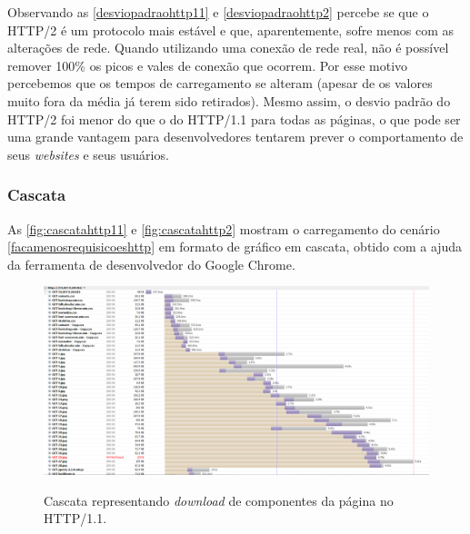 
\clearpage


Observando as \autoref{desviopadraohttp11} e \autoref{desviopadraohttp2} percebe se que o HTTP/2 é um protocolo mais estável e que, aparentemente, sofre menos com as alterações de rede. Quando utilizando uma conexão de rede real, não é possível remover 100\% os picos e vales de conexão que ocorrem. Por esse motivo percebemos que os tempos de carregamento se alteram (apesar de os valores muito fora da média já terem sido retirados). Mesmo assim, o desvio padrão do HTTP/2 foi menor do que o do HTTP/1.1 para todas as páginas, o que pode ser uma grande vantagem para desenvolvedores tentarem prever o comportamento de seus \textit{websites} e seus usuários.

\subsubsection{Cascata}
\label{cascata}

As \autoref{fig:cascatahttp11} e \autoref{fig:cascatahttp2} mostram o carregamento do cenário \autoref{facamenosrequisicoeshttp} em formato de gráfico em cascata, obtido com a ajuda da ferramenta de desenvolvedor do Google Chrome.

\begin{figure}[!htbp]
    \centering
    \caption{Cascata representando \textit{download} de componentes da página no HTTP/1.1.}
    \includegraphics[width=1.0\textwidth]{./04-figuras/analise-de-resultados/cascata_http11}
    \label{fig:cascatahttp11}
\end{figure}

